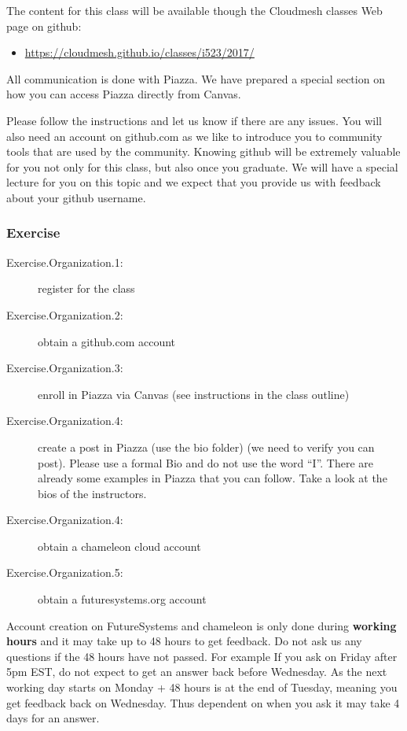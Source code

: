 The content for this class will be available though the Cloudmesh
classes Web page on github:

\begin{itemize}
\tightlist
\item
  \url{https://cloudmesh.github.io/classes/i523/2017/}
\end{itemize}

All communication is done with Piazza. We have prepared a special
section on how you can access Piazza directly from Canvas.

Please follow the instructions and let us know if there are any issues.
You will also need an account on github.com as we like to introduce you
to community tools that are used by the community. Knowing github will
be extremely valuable for you not only for this class, but also once you
graduate. We will have a special lecture for you on this topic and we
expect that you provide us with feedback about your github username.

\subsubsection{Exercise}

\begin{description}
\item[Exercise.Organization.1:] register for the class
\item[Exercise.Organization.2:] obtain a github.com account
\item[Exercise.Organization.3:] enroll in Piazza via Canvas (see
  instructions in the class outline)
\item[Exercise.Organization.4:] create a post in Piazza (use the bio
  folder) (we need to verify you can post). Please use a formal Bio
  and do not use the word ``I''. There are already some examples in
  Piazza that you can follow. Take a look at the bios of the
  instructors.
\item[Exercise.Organization.4:] obtain a chameleon cloud account
\item[Exercise.Organization.5:] obtain a futuresystems.org account
\end{description}

Account creation on FutureSystems and chameleon is only done during
\textbf{working hours} and it may take up to 48 hours to get
feedback. Do not ask us any questions if the 48 hours have not passed.
For example If you ask on Friday after 5pm EST, do not expect to get
an answer back before Wednesday. As the next working day starts on
Monday + 48 hours is at the end of Tuesday, meaning you get feedback
back on Wednesday. Thus dependent on when you ask it may take 4 days
for an answer.

